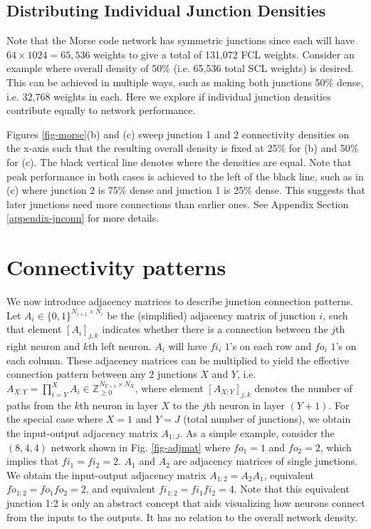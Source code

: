 \documentclass[conference]{IEEEtran}
\begin{document}
\subsection{Distributing Individual Junction Densities}\label{jnconn}

Note that the Morse code network has symmetric junctions since each will have $64\times1024 = 65,536$ weights to give a total of 131,072 FCL weights. Consider an example where overall density of 50\% (i.e. 65,536 total SCL weights) is desired. This can be achieved in multiple ways, such as making both junctions 50\% dense, i.e. 32,768 weights in each. Here we explore if individual junction densities contribute equally to network performance.

Figures \ref{fig-morse}(b) and (c) sweep junction 1 and 2 connectivity densities on the x-axis such that the resulting overall density is fixed at 25\% for (b) and 50\% for (c). The black vertical line denotes where the densities are equal. Note that peak performance in both cases is achieved to the left of the black line, such as in (c) where junction 2 is 75\% dense and junction 1 is 25\% dense. This suggests that later junctions need more connections than earlier ones. See Appendix Section \ref{appendix-jnconn} for more details.


\section{Connectivity patterns}\label{connpatt}
We now introduce adjacency matrices to describe junction connection patterns. Let $A_i\in\{0,1\}^{N_{i+1}\times N_i}$ be the (simplified) adjacency matrix of junction $i$, such that element $[A_i]_{j,k}$ indicates whether there is a connection between the $j$th right neuron and $k$th left neuron. $A_i$ will have $fi_i$ $1$'s on each row and $fo_i$ $1$'s on each column. These adjacency matrices can be multiplied to yield the effective connection pattern between any 2 junctions $X$ and $Y$, i.e.~$A_{X:Y}=\prod_{i=Y}^X A_i \in \mathbb{Z}_{\geq 0}^{N_{Y+1}\times N_X}$, where element $[A_{X:Y}]_{j,k}$ denotes the number of paths from the $k$th neuron in layer $X$ to the $j$th neuron in layer $(Y+1)$. For the special case where $X=1$ and $Y=J$ (total number of junctions), we obtain the input-output adjacency matrix $A_{1:J}$. As a simple example, consider the $(8,4,4)$ network shown in Fig. \ref{fig-adjmat} where $fo_1=1$ and $fo_2=2$, which implies that $fi_1=fi_2=2$. $A_1$ and $A_2$ are adjacency matrices of single junctions. We obtain the input-output adjacency matrix $A_{1:2} = A_2A_1$, equivalent $fo_{1:2}=fo_1fo_2=2$, and equivalent $fi_{1:2}=fi_1fi_2=4$. Note that this equivalent junction 1:2 is only an abstract concept that aids visualizing how neurons connect from the inputs to the outputs. It has no relation to the overall network density.
\end{document}
